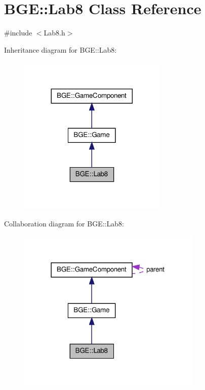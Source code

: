\hypertarget{class_b_g_e_1_1_lab8}{\section{B\-G\-E\-:\-:Lab8 Class Reference}
\label{class_b_g_e_1_1_lab8}
}


{\ttfamily \#include $<$Lab8.\-h$>$}



Inheritance diagram for B\-G\-E\-:\-:Lab8\-:
\nopagebreak
\begin{figure}[H]
\begin{center}
\leavevmode
\includegraphics[width=200pt]{class_b_g_e_1_1_lab8__inherit__graph}
\end{center}
\end{figure}


Collaboration diagram for B\-G\-E\-:\-:Lab8\-:
\nopagebreak
\begin{figure}[H]
\begin{center}
\leavevmode
\includegraphics[width=249pt]{class_b_g_e_1_1_lab8__coll__graph}
\end{center}
\end{figure}

